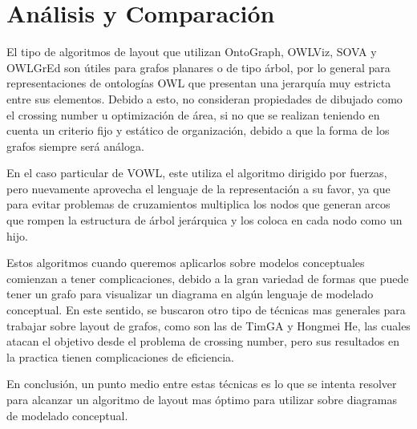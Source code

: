 
\section{Análisis y Comparación}
El tipo de algoritmos de layout que utilizan OntoGraph, OWLViz, SOVA y OWLGrEd son útiles para grafos planares o de tipo árbol, por lo general para representaciones de ontologías OWL que presentan una jerarquía muy estricta entre sus elementos. Debido a esto, no consideran propiedades de dibujado como el crossing number u optimización de área, si no que se realizan teniendo en cuenta un criterio fijo y estático de organización, debido a que la forma de los grafos siempre será análoga.

En el caso particular de VOWL, este utiliza el algoritmo dirigido por fuerzas, pero nuevamente aprovecha el lenguaje de la representación a su favor, ya que para evitar problemas de cruzamientos multiplica los nodos que generan arcos que rompen la estructura de árbol jerárquica y los coloca en cada nodo como un hijo.

Estos algoritmos cuando queremos aplicarlos sobre modelos conceptuales comienzan a tener complicaciones, debido a la gran variedad de formas que puede tener un grafo para visualizar un diagrama en algún lenguaje de modelado conceptual. En este sentido, se buscaron otro tipo de técnicas mas generales para trabajar sobre layout de grafos, como son las de TimGA y Hongmei He, las cuales atacan el objetivo desde el problema de crossing number, pero sus resultados en la practica tienen complicaciones de eficiencia.

En conclusión, un punto medio entre estas técnicas es lo que se intenta resolver para alcanzar un algoritmo de layout mas óptimo para utilizar sobre diagramas de modelado conceptual.